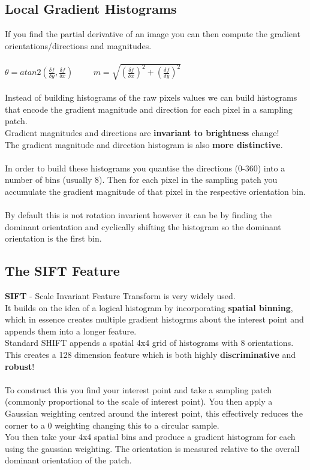 \documentclass{article}
\begin{document}
	\subsection*{Local Gradient Histograms}
	If you find the partial derivative of an image you can then compute the gradient orientations/directions and magnitudes.\\
	\\
	\begin{math}
	\theta = atan2(\frac{\delta f}{\delta y},\frac{\delta f}{\delta x}) \hspace{1cm}
	m = \sqrt{(\frac{\delta f}{\delta x})^2 + (\frac{\delta f}{\delta y})^2}
	\end{math}
	\\
	\\
	Instead of building histograms of the raw pixels values we can build histograms that encode the gradient magnitude and direction for each pixel in a sampling patch.\\
	Gradient magnitudes and directions are {\bfseries invariant to brightness} change!\\
	The gradient magnitude and direction histogram is also {\bfseries more distinctive}.\\
	\\
	In order to build these histograms you quantise the directions (0-360) into a number of bins (usually 8). Then for each pixel in the sampling patch you accumulate the gradient magnitude of that pixel in the respective orientation bin.\\
	\\By default this is not rotation invarient however it can be by finding the dominant orientation and cyclically shifting the histogram so the dominant orientation is the first bin.
	
	\subsection*{The SIFT Feature}
	{\bfseries SIFT} - Scale Invariant Feature Transform is very widely used.\\
	It builds on the idea of a logical histogram by incorporating {\bfseries spatial binning}, which in essence creates multiple gradient histogrms about the interest point and appends them into a longer feature.\\
	Standard SHIFT appends a spatial 4x4 grid of histograms with 8 orientations. This creates a 128 dimension feature which is both highly {\bfseries discriminative} and {\bfseries robust}!\\
	\\To construct this you find your interest point and take a sampling patch (commonly proportional to the scale of interest point). You then apply a Gaussian weighting centred around the interest point, this effectively reduces the corner to a 0 weighting changing this to a circular sample.\\
	You then take your 4x4 spatial bins and produce a gradient histogram for each using the gaussian weighting. The orientation is measured relative to the overall dominant orientation of the patch.
	
\end{document}
